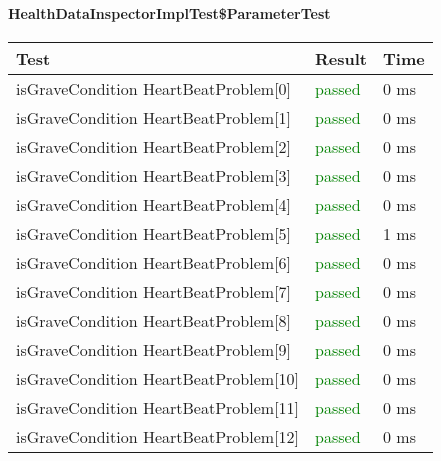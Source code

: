 \paragraph{HealthDataInspectorImplTest\$ParameterTest}

\begin{adjustwidth}{1cm}{}
        \begin{longtable}{|p{}|p{}|p{}|}
            \hline
            \textbf{Test} & \textbf{Result} & \textbf{Time} \\
            \hline
            isGraveCondition HeartBeatProblem[0] & \textcolor{green}{passed} & 0 ms \\
            \hline 
            isGraveCondition HeartBeatProblem[1] & \textcolor{green}{passed} & 0 ms \\
            \hline 
            isGraveCondition HeartBeatProblem[2] & \textcolor{green}{passed} & 0 ms \\
            \hline 
            isGraveCondition HeartBeatProblem[3] & \textcolor{green}{passed} & 0 ms \\
            \hline 
            isGraveCondition HeartBeatProblem[4] & \textcolor{green}{passed} & 0 ms \\
            \hline 
            isGraveCondition HeartBeatProblem[5] & \textcolor{green}{passed} & 1 ms \\
            \hline 
            isGraveCondition HeartBeatProblem[6] & \textcolor{green}{passed} & 0 ms \\
            \hline 
            isGraveCondition HeartBeatProblem[7] & \textcolor{green}{passed} & 0 ms \\
            \hline 
            isGraveCondition HeartBeatProblem[8] & \textcolor{green}{passed} & 0 ms \\
            \hline 
            isGraveCondition HeartBeatProblem[9] & \textcolor{green}{passed} & 0 ms \\
            \hline
            isGraveCondition HeartBeatProblem[10] & \textcolor{green}{passed} & 0 ms \\
            \hline
            isGraveCondition HeartBeatProblem[11] & \textcolor{green}{passed} & 0 ms \\
            \hline
            isGraveCondition HeartBeatProblem[12] & \textcolor{green}{passed} & 0 ms \\
            \hline
        
        \end{longtable}
    \end{adjustwidth}


